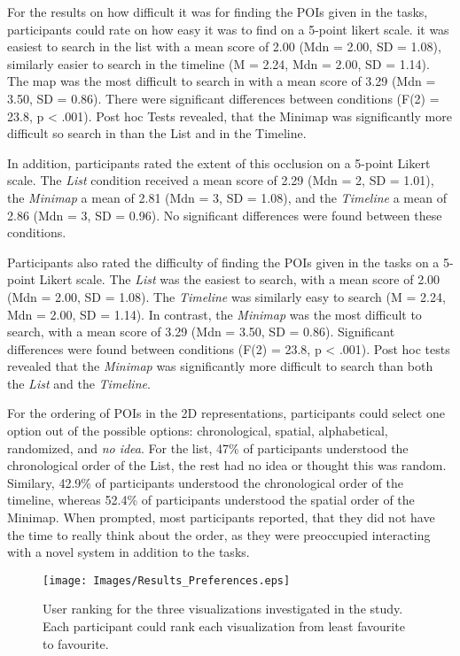 For the results on how difficult it was for finding the POIs given in the tasks, participants could rate on how easy it was to find on a 5-point likert scale. it was easiest to search in the list with a mean score of 2.00 (Mdn = 2.00, SD = 1.08), similarly easier to search in the timeline (M = 2.24, Mdn = 2.00, SD = 1.14). The map was the most difficult to search in with a mean score of 3.29 (Mdn = 3.50, SD = 0.86). There were significant differences between conditions (F(2) = 23.8, p < .001). Post hoc Tests revealed, that the Minimap was significantly more difficult so search in than the List and in the Timeline.

In addition, participants rated the extent of this occlusion on a 5-point Likert scale. The \textit{List} condition received a mean score of 2.29 (Mdn = 2, SD = 1.01), the \textit{Minimap} a mean of 2.81 (Mdn = 3, SD = 1.08), and the \textit{Timeline} a mean of 2.86 (Mdn = 3, SD = 0.96). No significant differences were found between these conditions.

Participants also rated the difficulty of finding the POIs given in the tasks on a 5-point Likert scale. The \textit{List} was the easiest to search, with a mean score of 2.00 (Mdn = 2.00, SD = 1.08). The \textit{Timeline} was similarly easy to search (M = 2.24, Mdn = 2.00, SD = 1.14). In contrast, the \textit{Minimap} was the most difficult to search, with a mean score of 3.29 (Mdn = 3.50, SD = 0.86). Significant differences were found between conditions (F(2) = 23.8, p < .001). Post hoc tests revealed that the \textit{Minimap} was significantly more difficult to search than both the \textit{List} and the \textit{Timeline}.

For the ordering of POIs in the 2D representations, participants could select one option out of the possible options: chronological, spatial, alphabetical, randomized, and \textit{no idea}. For the list, 47\% of participants understood the chronological order of the List, the rest had no idea or thought this was random. Similary, 42.9\% of participants understood the chronological order of the timeline, whereas 52.4\% of participants understood the spatial order of the Minimap. When prompted, most participants reported, that they did not have the time to really think about the order, as they were preoccupied interacting with a novel system in addition to the tasks.


\begin{figure}[ht]
    \centering
    \texttt{[image: Images/Results\_Preferences.eps]}
    \caption{User ranking for the three visualizations investigated in the study. Each participant could rank each visualization from least favourite to favourite.}
    \label{fig:results_preferences}
\end{figure}


